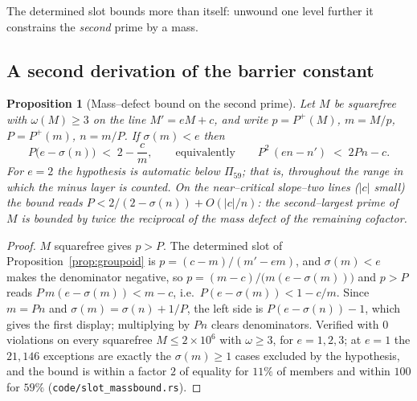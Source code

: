 \documentclass[11pt]{article}
\newtheorem{proposition}[theorem]{Proposition}
\theoremstyle{definition}
\begin{document}
The determined slot bounds more than itself: unwound one level further it constrains the
\emph{second} prime by a mass.

\subsection{A second derivation of the barrier constant}\label{ssec:secondbarrier}

\begin{proposition}[Mass--defect bound on the second prime]\label{prop:massbound}
Let $M$ be squarefree with $\omega(M)\ge3$ on the line $M'=eM+c$, and write $p=P^+(M)$, $m=M/p$,
$P=P^+(m)$, $n=m/P$. If $\sigma(m)<e$ then
\[ P\bigl(e-\sigma(n)\bigr)\;<\;2-\frac cm,\qquad\text{equivalently}\qquad
   P^2\,(en-n')\;<\;2Pn-c. \]
For $e=2$ the hypothesis is automatic below $\Pi_{59}$; that is, throughout the range in which the
minus layer is counted. On the near--critical slope--two lines ($|c|$ small) the bound reads
$P<2/(2-\sigma(n))+O(|c|/n)$: \emph{the second--largest prime of $M$ is bounded by twice the
reciprocal of the mass defect of the remaining cofactor.}
\end{proposition}
\begin{proof}
$M$ squarefree gives $p>P$. The determined slot of Proposition~\ref{prop:groupoid} is
$p=(c-m)/(m'-em)$, and $\sigma(m)<e$ makes the denominator negative, so
$p=(m-c)/\bigl(m(e-\sigma(m))\bigr)$ and $p>P$ reads $P\,m(e-\sigma(m))<m-c$, i.e.\
$P(e-\sigma(m))<1-c/m$. Since $m=Pn$ and $\sigma(m)=\sigma(n)+1/P$, the left side is
$P(e-\sigma(n))-1$, which gives the first display; multiplying by $Pn$ clears denominators.
Verified with $0$ violations on every squarefree $M\le2\times10^6$ with $\omega\ge3$, for
$e=1,2,3$; at $e=1$ the $21{,}146$ exceptions are exactly the $\sigma(m)\ge1$ cases excluded by the
hypothesis, and the bound is within a factor $2$ of equality for $11\%$ of members and within $100$
for $59\%$ (\texttt{code/slot\_massbound.rs}).
\end{proof}
\end{document}
